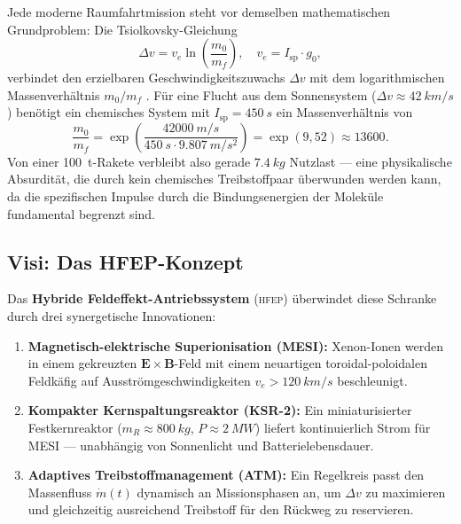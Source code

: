 ﻿\documentclass[a4paper,12pt,twoside]{article}
\theoremstyle{plain}
\theoremstyle{definition}
\theoremstyle{remark}
\newcommand{\Isp}{I_{\mathrm{sp}}}
\newcommand{\ve}{v_e}
\newcommand{\Dv}{\Delta v}
\newcommand{\mdot}{\dot{m}}
\newcommand{\mzero}{m_0}
\newcommand{\mf}{m_f}
\newcommand{\HFEP}{\textsc{hfep}}
\newcommand{\gzero}{g_0}
\begin{document}
	Jede moderne Raumfahrtmission steht vor demselben mathematischen Grundproblem:
	Die Tsiolkovsky-Gleichung
	\begin{equation}
		\Dv = \ve \ln\!\left(\frac{\mzero}{\mf}\right), \quad \ve = \Isp \cdot \gzero,
		\label{eq:tsiolkovsky}
	\end{equation}
	verbindet den erzielbaren Geschwindigkeitszuwachs $\Dv$ mit dem logarithmischen
	Massenverhältnis $\mzero/\mf$ \cite{tsiolkovsky1903, sutton2010}. Für eine Flucht aus dem Sonnensystem
	($\Dv \approx \SI{42}{km/s}$) benötigt ein chemisches System mit
	$\Isp = \SI{450}{s}$ ein Massenverhältnis von
	\begin{equation}
		\frac{\mzero}{\mf} = \exp\!\left(\frac{\SI{42000}{m/s}}{\SI{450}{s}\cdot\SI{9.807}{m/s^2}}\right)
		= \exp(9{,}52) \approx \num{13600}.
	\end{equation}
	Von einer \SI{100}{t}-Rakete verbleibt also gerade $\SI{7.4}{kg}$ Nutzlast ---
	eine physikalische Absurdität, die durch kein chemisches Treibstoffpaar überwunden
	werden kann, da die spezifischen Impulse durch die Bindungsenergien der Moleküle
	fundamental begrenzt sind.
	
	\subsection{Visi: Das HFEP-Konzept}
	
	Das \textbf{Hybride Feldeffekt-Antriebssystem} (\HFEP) überwindet diese Schranke
	durch drei synergetische Innovationen:
	
	\begin{enumerate}
		\item \textbf{Magnetisch-elektrische Superionisation (MESI):}
		Xenon-Ionen werden in einem gekreuzten $\mathbf{E}\times\mathbf{B}$-Feld
		mit einem neuartigen toroidal-poloidalen Feldkäfig auf
		Ausströmgeschwindigkeiten $\ve > \SI{120}{km/s}$ beschleunigt.
		
		\item \textbf{Kompakter Kernspaltungsreaktor (KSR-2):}
		Ein miniaturisierter Festkernreaktor ($m_R \approx \SI{800}{kg}$,
		$P \approx \SI{2}{MW}$) liefert kontinuierlich Strom für MESI ---
		unabhängig von Sonnenlicht und Batterielebensdauer.
		
		\item \textbf{Adaptives Treibstoffmanagement (ATM):}
		Ein Regelkreis passt den Massenfluss $\mdot(t)$ dynamisch
		an Missionsphasen an, um $\Dv$ zu maximieren und gleichzeitig
		ausreichend Treibstoff für den Rückweg zu reservieren.
	\end{enumerate}
	
\end{document}
